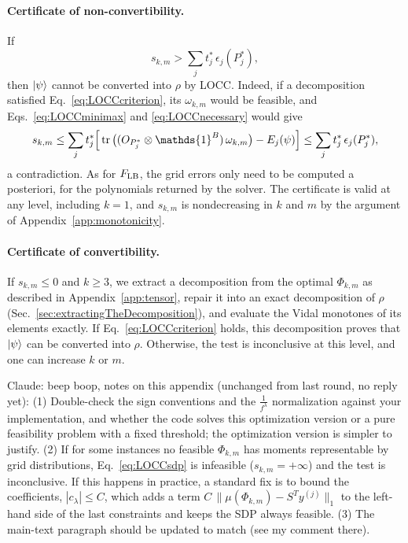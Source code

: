\documentclass[aps,pra,twocolumn,showpacs,superscriptaddress,groupedaddress]{revtex4-2}
\newcommand{\one}[0]{\mathds{1}}
\newcommand{\claude}[1]{{\color{claudeorange} Claude: beep boop, #1}}
\newcommand{\I}{\one}
\begin{document}
\begin{widetext}
\paragraph*{Certificate of non-convertibility.}
If
\begin{equation}\label{eq:LOCCcertificate}
    s_{k,m}>\sum_j t_j^*\,\epsilon_j(P_j^*),
\end{equation}
then $\ket{\psi}$ cannot be converted into $\rho$ by LOCC. Indeed, if a decomposition satisfied Eq.~\eqref{eq:LOCCcriterion}, its $\omega_{k,m}$ would be feasible, and Eqs.~\eqref{eq:LOCCminimax} and \eqref{eq:LOCCnecessary} would give
\begin{equation}
    s_{k,m}\leq\sum_j t^*_j\Big[\tr\big((O_{P^*_j}\otimes\I^B)\,\omega_{k,m}\big)-E_j(\psi)\Big]\leq\sum_jt^*_j\,\epsilon_j(P^*_j),
\end{equation}
a contradiction. As for $F_{\rm LB}$, the grid errors only need to be computed a posteriori, for the polynomials returned by the solver. The certificate is valid at any level, including $k=1$, and $s_{k,m}$ is nondecreasing in $k$ and $m$ by the argument of Appendix~\ref{app:monotonicity}.

\paragraph*{Certificate of convertibility.}
If $s_{k,m}\leq0$ and $k\geq3$, we extract a decomposition from the optimal $\Phi_{k,m}$ as described in Appendix~\ref{app:tensor}, repair it into an exact decomposition of $\rho$ (Sec.~\ref{sec:extractingTheDecomposition}), and evaluate the Vidal monotones of its elements exactly. If Eq.~\eqref{eq:LOCCcriterion} holds, this decomposition proves that $\ket{\psi}$ can be converted into $\rho$. Otherwise, the test is inconclusive at this level, and one can increase $k$ or $m$.

\claude{notes on this appendix (unchanged from last round, no reply yet): (1) Double-check the sign conventions and the $\frac{1}{f^\lambda}$ normalization against your implementation, and whether the code solves this optimization version or a pure feasibility problem with a fixed threshold; the optimization version is simpler to justify. (2) If for some instances no feasible $\Phi_{k,m}$ has moments representable by grid distributions, Eq.~\eqref{eq:LOCCsdp} is infeasible ($s_{k,m}=+\infty$) and the test is inconclusive. If this happens in practice, a standard fix is to bound the coefficients, $|c_\lambda|\leq C$, which adds a term $C\,\|\mu(\Phi_{k,m})-S^Ty^{(j)}\|_1$ to the left-hand side of the last constraints and keeps the SDP always feasible. (3) The main-text paragraph should be updated to match (see my comment there).}


\end{widetext}
\end{document}
